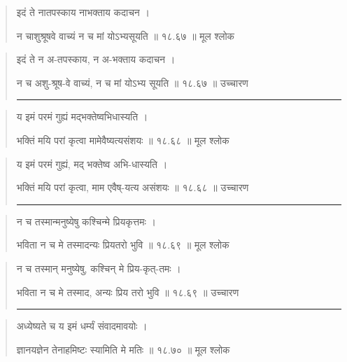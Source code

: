 \begin{quotation}

इदं ते नातपस्काय नाभक्ताय कदाचन  ।  

न चाशुश्रूषवे वाच्यं न च मां योऽभ्यसूयति  ॥ १८.६७ ॥  मूल श्लोक
\end{quotation}

\begin{quotation}

इदं ते न अ-तपस्काय, न अ-भक्ताय कदाचन  ।  

न च अशु-श्रूष-वे वाच्यं, न च मां योऽभ्य सूयति  ॥ १८.६७ ॥  उच्चारण

\noindent\rule{16cm}{0.4pt} 
\end{quotation}


\begin{quotation}

य इमं परमं गुह्यं मद्भक्तेष्वभिधास्यति  ।  

भक्तिं मयि परां कृत्वा मामेवैष्यत्यसंशयः  ॥ १८.६८ ॥  मूल श्लोक
\end{quotation}

\begin{quotation}

य इमं परमं गुह्यं, मद् भक्तेष्व अभि-धास्यति  ।  

भक्तिं मयि परां कृत्वा, माम एवैष्-यत्य असंशयः  ॥ १८.६८ ॥  उच्चारण

\noindent\rule{16cm}{0.4pt} 
\end{quotation}


\begin{quotation}

न च तस्मान्मनुष्येषु कश्चिन्मे प्रियकृत्तमः  ।  

भविता न च मे तस्मादन्यः प्रियतरो भुवि  ॥ १८.६९ ॥  मूल श्लोक
\end{quotation}

\begin{quotation}

न च तस्मान् मनुष्येषु, कश्चिन् मे प्रिय-कृत्-तमः  ।  

भविता न च मे तस्माद, अन्यः प्रिय तरो भुवि  ॥ १८.६९ ॥  उच्चारण

\noindent\rule{16cm}{0.4pt} 
\end{quotation}


\begin{quotation}

अध्येष्यते च य इमं धर्म्यं संवादमावयोः  ।  

ज्ञानयज्ञेन तेनाहमिष्टः स्यामिति मे मतिः  ॥ १८.७० ॥  मूल श्लोक
\end{quotation}

